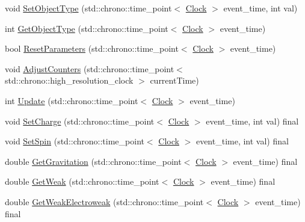 \begin{DoxyCompactItemize}
\item 
void \mbox{\hyperlink{classDimension_a484621a7c6f9b43f6e251ba04e0fdf8b}{Set\+Object\+Type}} (std\+::chrono\+::time\+\_\+point$<$ \mbox{\hyperlink{universe_8h_a0ef8d951d1ca5ab3cfaf7ab4c7a6fd80}{Clock}} $>$ event\+\_\+time, int val)
\item 
int \mbox{\hyperlink{classDimension_a72f494215a114cb43cecd9b170bcde51}{Get\+Object\+Type}} (std\+::chrono\+::time\+\_\+point$<$ \mbox{\hyperlink{universe_8h_a0ef8d951d1ca5ab3cfaf7ab4c7a6fd80}{Clock}} $>$ event\+\_\+time)
\item 
bool \mbox{\hyperlink{classDimension_af83732dba929ae01aca457e7d6121374}{Reset\+Parameters}} (std\+::chrono\+::time\+\_\+point$<$ \mbox{\hyperlink{universe_8h_a0ef8d951d1ca5ab3cfaf7ab4c7a6fd80}{Clock}} $>$ event\+\_\+time)
\item 
void \mbox{\hyperlink{classDimension_a31e28c2777888449fad32843f6dd15ed}{Adjust\+Counters}} (std\+::chrono\+::time\+\_\+point$<$ std\+::chrono\+::high\+\_\+resolution\+\_\+clock $>$ current\+Time)
\item 
int \mbox{\hyperlink{classDimension_a663916c2573b6df4db02ccee5678a75d}{Update}} (std\+::chrono\+::time\+\_\+point$<$ \mbox{\hyperlink{universe_8h_a0ef8d951d1ca5ab3cfaf7ab4c7a6fd80}{Clock}} $>$ event\+\_\+time)
\item 
void \mbox{\hyperlink{classDimension_a6d3f7fa4a26b92d8ae6161a1b8bb8220}{Set\+Charge}} (std\+::chrono\+::time\+\_\+point$<$ \mbox{\hyperlink{universe_8h_a0ef8d951d1ca5ab3cfaf7ab4c7a6fd80}{Clock}} $>$ event\+\_\+time, int val) final
\item 
void \mbox{\hyperlink{classDimension_a8d73c050c67b0226572b4a1b08ae6594}{Set\+Spin}} (std\+::chrono\+::time\+\_\+point$<$ \mbox{\hyperlink{universe_8h_a0ef8d951d1ca5ab3cfaf7ab4c7a6fd80}{Clock}} $>$ event\+\_\+time, int val) final
\item 
double \mbox{\hyperlink{classDimension_a652220a2eb1b26c749ad032865d81788}{Get\+Gravitation}} (std\+::chrono\+::time\+\_\+point$<$ \mbox{\hyperlink{universe_8h_a0ef8d951d1ca5ab3cfaf7ab4c7a6fd80}{Clock}} $>$ event\+\_\+time) final
\item 
double \mbox{\hyperlink{classDimension_a656ce92d07ea600cc0ec53865ad515e2}{Get\+Weak}} (std\+::chrono\+::time\+\_\+point$<$ \mbox{\hyperlink{universe_8h_a0ef8d951d1ca5ab3cfaf7ab4c7a6fd80}{Clock}} $>$ event\+\_\+time) final
\item 
double \mbox{\hyperlink{classDimension_a5bb5a164564013a60728854cc2e5ddb3}{Get\+Weak\+Electroweak}} (std\+::chrono\+::time\+\_\+point$<$ \mbox{\hyperlink{universe_8h_a0ef8d951d1ca5ab3cfaf7ab4c7a6fd80}{Clock}} $>$ event\+\_\+time) final

\end{DoxyCompactItemize}
